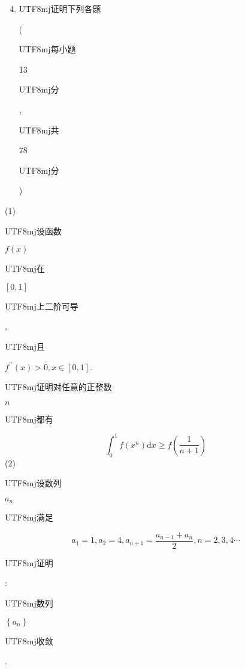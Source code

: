 \documentclass[10pt]{article}
\begin{document}
\begin{enumerate}
  \setcounter{enumi}{3}
  \item \begin{CJK}{UTF8}{mj}证明下列各题\end{CJK} (\begin{CJK}{UTF8}{mj}每小题\end{CJK} 13 \begin{CJK}{UTF8}{mj}分\end{CJK}, \begin{CJK}{UTF8}{mj}共\end{CJK} 78 \begin{CJK}{UTF8}{mj}分\end{CJK})
\end{enumerate}
(1) \begin{CJK}{UTF8}{mj}设函数\end{CJK} $f(x)$ \begin{CJK}{UTF8}{mj}在\end{CJK} $[0,1]$ \begin{CJK}{UTF8}{mj}上二阶可导\end{CJK}, \begin{CJK}{UTF8}{mj}且\end{CJK} $f^{\prime \prime}(x)>0, x \in[0,1]$. \begin{CJK}{UTF8}{mj}证明对任意的正整数\end{CJK} $n$ \begin{CJK}{UTF8}{mj}都有\end{CJK}
$$
\int_{0}^{1} f\left(x^{n}\right) \mathrm{d} x \geq f\left(\frac{1}{n+1}\right)
$$
(2) \begin{CJK}{UTF8}{mj}设数列\end{CJK} $a_{n}$ \begin{CJK}{UTF8}{mj}满足\end{CJK}
$$
a_{1}=1, a_{2}=4, a_{n+1}=\frac{a_{n-1}+a_{n}}{2}, n=2,3,4 \cdots
$$
\begin{CJK}{UTF8}{mj}证明\end{CJK}: \begin{CJK}{UTF8}{mj}数列\end{CJK} $\left\{a_{n}\right\}$ \begin{CJK}{UTF8}{mj}收敛\end{CJK}.
\end{document}
